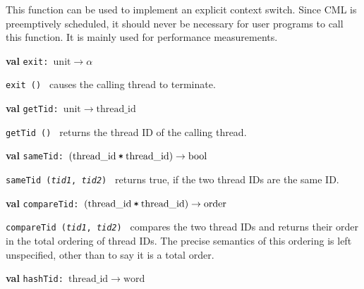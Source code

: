 \begin{descr}
\begin{speccomment}
\item 

	This function can be used to implement an explicit context switch.\- 	Since CML is preemptively scheduled, it should never be necessary for 	user programs to call this function.\- 	It is mainly used for performance measurements.\-     \end{speccomment}
\item {}{\textbf{val}} {\tt exit: \(\mathrm{unit}\rightarrow \alpha\)}\label{val-CML.exit}


\begin{speccomment}
\item {\tt exit () 	} 
causes the calling thread to terminate.\-     \end{speccomment}
\item {}{\textbf{val}} {\tt getTid: \(\mathrm{unit}\rightarrow \mathrm{thread\_id}\)}\label{val-CML.getTid}


\begin{speccomment}
\item {\tt get\-Tid ()           } 
returns the thread ID of the calling thread.\-     \end{speccomment}
\item {}{\textbf{val}} {\tt sameTid: \((\mathrm{thread\_id}\:\verb,*,\:\mathrm{thread\_id})\rightarrow \mathrm{bool}\)}\label{val-CML.sameTid}


\begin{speccomment}
\item {\tt same\-Tid (\textit{tid1}, \textit{tid2})           } 
returns true, if the two thread IDs are the same ID.\-     \end{speccomment}
\item {}{\textbf{val}} {\tt compareTid: \((\mathrm{thread\_id}\:\verb,*,\:\mathrm{thread\_id})\rightarrow \mathrm{order}\)}\label{val-CML.compareTid}


\begin{speccomment}
\item {\tt compare\-Tid (\textit{tid1}, \textit{tid2})           } 
compares the two thread IDs and returns their order in the total 	  ordering of thread IDs.\- 	  The precise semantics of this ordering is left unspecified, other 	  than to say it is a total order.\-     \end{speccomment}
\item {}{\textbf{val}} {\tt hashTid: \(\mathrm{thread\_id}\rightarrow \mathrm{word}\)}\label{val-CML.hashTid}



\end{descr}
